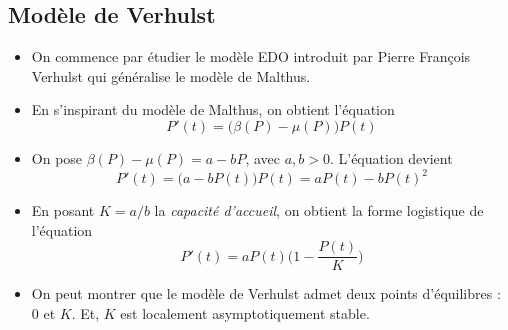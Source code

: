 
\subsection{Modèle de Verhulst}
\begin{frame}
    \begin{itemize}
        \item On commence par étudier le modèle EDO introduit par Pierre François Verhulst qui généralise le modèle de Malthus. \pause
        \item En s'inspirant du modèle de Malthus, on obtient l'équation 
        \begin{equation*}
            P'(t) = \big(\beta(P)-\mu(P)\big)P(t)
        \end{equation*} \pause
        \item On pose $\beta(P)-\mu(P)=a-bP$, avec $a,b>0$. L'équation devient 
        \begin{equation*}
            P'(t) = \big(a-bP(t)\big)P(t) = aP(t)-bP(t)^2
        \end{equation*} \pause
        \item En posant $K=a/b$ la \textcolor{astral}{\textit{capacité d'accueil}}, on obtient la forme \og logistique \fg{} de l'équation 
        \begin{equation*}
            P'(t) = aP(t)\Big(1-\frac{P(t)}{K}\Big)
        \end{equation*} \pause
        \item On peut montrer que le modèle de Verhulst admet deux points d'équilibres : $0$ et $K$. Et, $K$ est localement asymptotiquement stable.
    \end{itemize}
\end{frame}

